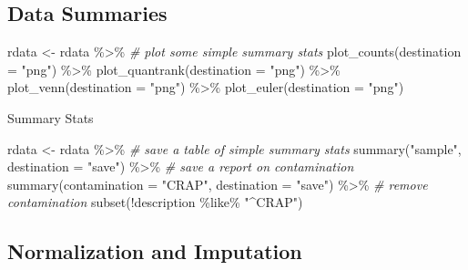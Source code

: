 \documentclass[
]{book}
\newenvironment{Shaded}{\begin{snugshade}}{\end{snugshade}}
\newcommand{\AttributeTok}[1]{\textcolor[rgb]{0.77,0.63,0.00}{#1}}
\newcommand{\CommentTok}[1]{\textcolor[rgb]{0.56,0.35,0.01}{\textit{#1}}}
\newcommand{\FunctionTok}[1]{\textcolor[rgb]{0.00,0.00,0.00}{#1}}
\newcommand{\NormalTok}[1]{#1}
\newcommand{\OtherTok}[1]{\textcolor[rgb]{0.56,0.35,0.01}{#1}}
\newcommand{\SpecialCharTok}[1]{\textcolor[rgb]{0.00,0.00,0.00}{#1}}
\newcommand{\StringTok}[1]{\textcolor[rgb]{0.31,0.60,0.02}{#1}}
\begin{document}
\hypertarget{data-summaries}{%
\subsection{Data Summaries}\label{data-summaries}}

\begin{Shaded}
\begin{Highlighting}[]
\NormalTok{rdata }\OtherTok{\textless{}{-}}\NormalTok{ rdata }\SpecialCharTok{\%\textgreater{}\%}
  \CommentTok{\# plot some simple summary stats}
  \FunctionTok{plot\_counts}\NormalTok{(}\AttributeTok{destination =} \StringTok{"png"}\NormalTok{) }\SpecialCharTok{\%\textgreater{}\%}
  \FunctionTok{plot\_quantrank}\NormalTok{(}\AttributeTok{destination =} \StringTok{"png"}\NormalTok{) }\SpecialCharTok{\%\textgreater{}\%}
  \FunctionTok{plot\_venn}\NormalTok{(}\AttributeTok{destination =} \StringTok{"png"}\NormalTok{) }\SpecialCharTok{\%\textgreater{}\%}
  \FunctionTok{plot\_euler}\NormalTok{(}\AttributeTok{destination =} \StringTok{"png"}\NormalTok{)}
\end{Highlighting}
\end{Shaded}

Summary Stats

\begin{Shaded}
\begin{Highlighting}[]
\NormalTok{rdata }\OtherTok{\textless{}{-}}\NormalTok{ rdata }\SpecialCharTok{\%\textgreater{}\%}
  \CommentTok{\# save a table of simple summary stats}
  \FunctionTok{summary}\NormalTok{(}\StringTok{"sample"}\NormalTok{, }\AttributeTok{destination =} \StringTok{"save"}\NormalTok{) }\SpecialCharTok{\%\textgreater{}\%}
  \CommentTok{\# save a report on contamination}
  \FunctionTok{summary}\NormalTok{(}\AttributeTok{contamination =} \StringTok{"CRAP"}\NormalTok{, }\AttributeTok{destination =} \StringTok{"save"}\NormalTok{) }\SpecialCharTok{\%\textgreater{}\%}
  \CommentTok{\# remove contamination}
  \FunctionTok{subset}\NormalTok{(}\SpecialCharTok{!}\NormalTok{description }\SpecialCharTok{\%like\%} \StringTok{"\^{}CRAP"}\NormalTok{)}
\end{Highlighting}
\end{Shaded}

\hypertarget{normalization-and-imputation}{%
\subsection{Normalization and Imputation}\label{normalization-and-imputation}}
\end{document}

